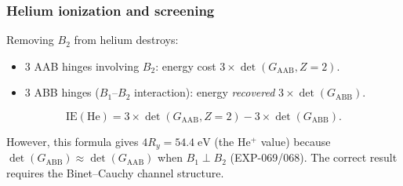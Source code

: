 \subsubsection{Helium ionization and screening}

Removing $B_2$ from helium destroys:
\begin{itemize}
\item 3 AAB hinges involving $B_2$: energy cost $3 \times \det(G_{\text{AAB}}, Z\!=\!2)$.
\item 3 ABB hinges ($B_1$--$B_2$ interaction): energy \emph{recovered} $3 \times \det(G_{\text{ABB}})$.
\end{itemize}

\begin{equation}
\text{IE}(\text{He}) = 3 \times \det(G_{\text{AAB}}, Z\!=\!2) - 3 \times \det(G_{\text{ABB}}).
\end{equation}

However, this formula gives $4R_y = 54.4\;\text{eV}$ (the He$^+$ value) because $\det(G_\text{ABB}) \approx \det(G_\text{AAB})$ when $B_1 \perp B_2$ (EXP-069/068).  The correct result requires the Binet--Cauchy channel structure.

